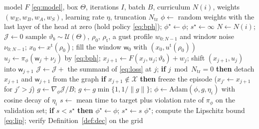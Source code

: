 \begin{algorithm}[t]\caption{Physics-informed training of HOT}\label{alg:train}\begin{algorithmic}[1]
\Require model $F$ \eqref{eq:model}, box $\Theta$, iterations $I$, batch $B$, curriculum $N(i)$, weights $(w_E,w_B,w_A,w_S)$, learning rate $\eta$, truncation $N_{\mathrm{tr}}$
\State $\phi\leftarrow$ random weights with the last layer of the head at zero (hold policy \eqref{eq:bph}); $\phi^\star\leftarrow\phi$; $s^\star\leftarrow\infty$
  \State $N\leftarrow N(i)$; $\mathcal J\leftarrow0$
    \State sample $\vartheta_b\sim\mathcal U(\Theta)$, $\rho_0$, $\rho_{\mathrm t}$, a gust profile $w_{0:N-1}$ and window noise $\nu_{0:N-1}$; $x_0\leftarrow x^{\mathrm t}(\rho_0)$; fill the window $\mathsf w_0$ with $(x_0,u^{\mathrm t}(\rho_0))$
      \State $u_j\leftarrow\pi_\phi(\mathsf w_j+\nu_j)$ by \eqref{eq:bph}; $x_{j+1}\leftarrow F(x_j,u_j;\vartheta_b)+w_j$; shift $(x_{j+1},u_j)$ into $\mathsf w_{j+1}$
      \State $\mathcal J\leftarrow\mathcal J+$ the summand of \eqref{eq:loss} at $j$; \textbf{if} $j\bmod N_{\mathrm{tr}}=0$ \textbf{then} detach $x_{j+1}$ and $\mathsf w_{j+1}$ from the graph
      \State \textbf{if} $x_{j+1}\notin\mathcal X$ \textbf{then} freeze the episode ($x_{j'}\leftarrow x_{j+1}$ for $j'>j$)
    \EndFor
  \EndFor
  \State $g\leftarrow\nabla_\phi\mathcal J/B$; $g\leftarrow g\min\{1,1/\|g\|\}$; $\phi\leftarrow\mathrm{Adam}(\phi,g,\eta_i)$ with cosine decay of $\eta_i$
    \State $s\leftarrow$ mean time to target plus violation rate of $\pi_\phi$ on the validation set; \textbf{if} $s<s^\star$ \textbf{then} $\phi^\star\leftarrow\phi$; $s^\star\leftarrow s$
  \EndIf
\EndFor
\State \Return $\phi^\star$; compute the Lipschitz bound \eqref{eq:lip}; verify Definition~\ref{def:dec} on the grid
\end{algorithmic}\end{algorithm}
